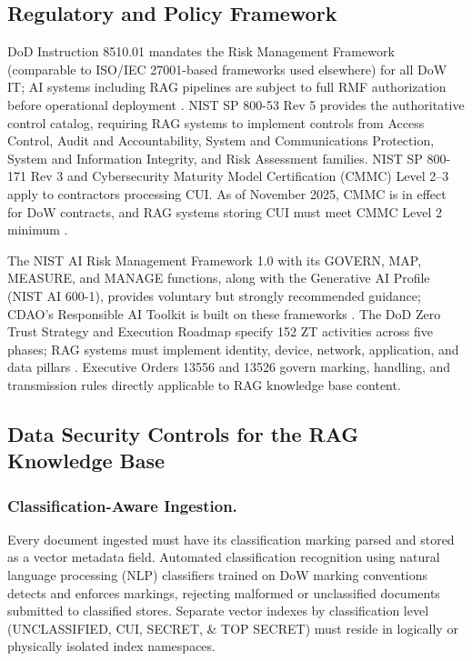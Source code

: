 \documentclass[12pt,letterpaper]{article}
\let\cite\parencite
\begin{document}
\subsection{Regulatory and Policy Framework}

DoD Instruction 8510.01 mandates the Risk Management Framework (comparable to ISO/IEC 27001-based frameworks used elsewhere) for all DoW IT; AI systems including RAG pipelines are subject to full RMF authorization before operational deployment \cite{cdao_rmf2024}. NIST SP 800-53 Rev 5 provides the authoritative control catalog, requiring RAG systems to implement controls from Access Control, Audit and Accountability, System and Communications Protection, System and Information Integrity, and Risk Assessment families. NIST SP 800-171 Rev 3 and Cybersecurity Maturity Model Certification (CMMC) Level 2--3 apply to contractors processing CUI. As of November 2025, CMMC is in effect for DoW contracts, and RAG systems storing CUI must meet CMMC Level 2 minimum \cite{wiley2025}.

The NIST AI Risk Management Framework 1.0 with its GOVERN, MAP, MEASURE, and MANAGE functions, along with the Generative AI Profile (NIST AI 600-1), provides voluntary but strongly recommended guidance; CDAO's Responsible AI Toolkit is built on these frameworks \cite{nist2025}. The DoD Zero Trust Strategy and Execution Roadmap specify 152 ZT activities across five phases; RAG systems must implement identity, device, network, application, and data pillars \cite{dod_zt2026}. Executive Orders 13556 and 13526 govern marking, handling, and transmission rules directly applicable to RAG knowledge base content.

\subsection{Data Security Controls for the RAG Knowledge Base}

\subsubsection{Classification-Aware Ingestion.}

Every document ingested must have its classification marking parsed and stored as a vector metadata field. Automated classification recognition using natural language processing (NLP) classifiers trained on DoW marking conventions detects and enforces markings, rejecting malformed or unclassified documents submitted to classified stores. Separate vector indexes by classification level (UNCLASSIFIED, CUI, SECRET, \& TOP SECRET) must reside in logically or physically isolated index namespaces.
\end{document}
